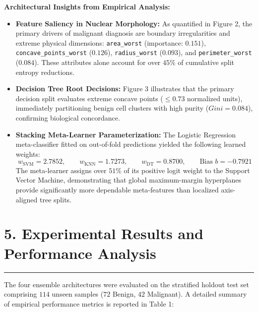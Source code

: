 \documentclass[11pt,a4paper]{article}
\begin{document}
\vspace{0.1cm}
\noindent\textbf{Architectural Insights from Empirical Analysis:}
\begin{itemize}[noitemsep,topsep=1pt,leftmargin=*]
    \item \textbf{Feature Saliency in Nuclear Morphology:} As quantified in Figure 2, the primary drivers of malignant diagnosis are boundary irregularities and extreme physical dimensions: \texttt{area\_worst} (importance: $0.151$), \texttt{concave\_points\_worst} ($0.126$), \texttt{radius\_worst} ($0.093$), and \texttt{perimeter\_worst} ($0.084$). These attributes alone account for over $45\%$ of cumulative split entropy reductions.
    \item \textbf{Decision Tree Root Decisions:} Figure 3 illustrates that the primary decision split evaluates extreme concave points ($\le 0.73$ normalized units), immediately partitioning benign cell clusters with high purity ($Gini = 0.084$), confirming biological concordance.
    \item \textbf{Stacking Meta-Learner Parameterization:} The Logistic Regression meta-classifier fitted on out-of-fold predictions yielded the following learned weights:
    \begin{equation*}
        w_{\text{SVM}} = 2.7852, \qquad w_{\text{KNN}} = 1.7273, \qquad w_{\text{DT}} = 0.8700, \qquad \text{Bias } b = -0.7921
    \end{equation*}
    The meta-learner assigns over $51\%$ of its positive logit weight to the Support Vector Machine, demonstrating that global maximum-margin hyperplanes provide significantly more dependable meta-features than localized axis-aligned tree splits.
\end{itemize}

\newpage

\section*{5. Experimental Results and Performance Analysis}
\noindent\rule{\textwidth}{0.5pt}\vspace{0.05cm}

The four ensemble architectures were evaluated on the stratified holdout test set comprising $114$ unseen samples ($72$ Benign, $42$ Malignant). A detailed summary of empirical performance metrics is reported in Table 1:
\end{document}
